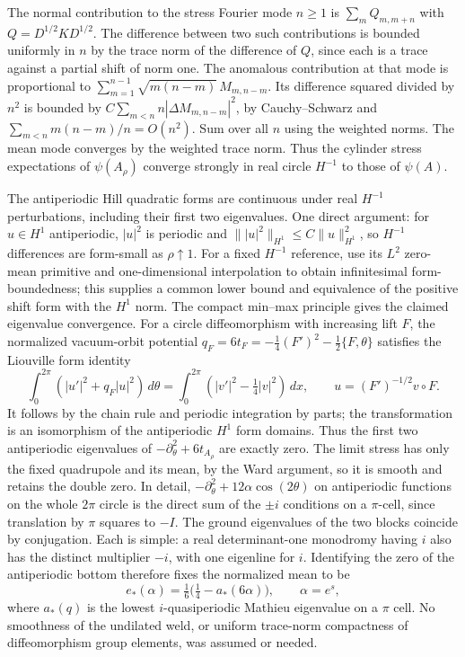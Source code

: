\documentclass[11pt]{article}
\begin{document}
The normal contribution to the stress Fourier mode \(n\ge1\) is \(\sum_m Q_{m,m+n}\) with \(Q=D^{1/2}KD^{1/2}\). The difference between two such contributions is bounded uniformly in \(n\) by the trace norm of the difference of \(Q\), since each is a trace against a partial shift of norm one. The anomalous contribution at that mode is proportional to \(\sum_{m=1}^{n-1}\sqrt{m(n-m)}\,M_{m,n-m}\). Its difference squared divided by \(n^2\) is bounded by \(C\sum_{m<n}n|\Delta M_{m,n-m}|^2\), by Cauchy--Schwarz and \(\sum_{m<n}m(n-m)/n=O(n^2)\). Sum over all \(n\) using the weighted norms. The mean mode converges by the weighted trace norm. Thus the cylinder stress expectations of \(\psi(A_\rho)\) converge strongly in real circle \(H^{-1}\) to those of \(\psi(A)\).

The antiperiodic Hill quadratic forms are continuous under real \(H^{-1}\) perturbations, including their first two eigenvalues. One direct argument: for \(u\in H^1\) antiperiodic, \(|u|^2\) is periodic and \(\||u|^2\|_{H^1}\le C\|u\|_{H^1}^2\), so \(H^{-1}\) differences are form-small as \(\rho\uparrow1\). For a fixed \(H^{-1}\) reference, use its \(L^2\) zero-mean primitive and one-dimensional interpolation to obtain infinitesimal form-boundedness; this supplies a common lower bound and equivalence of the positive shift form with the \(H^1\) norm. The compact min--max principle gives the claimed eigenvalue convergence. For a circle diffeomorphism with increasing lift \(F\), the normalized vacuum-orbit potential \(q_F=6t_F=-\tfrac14(F')^2-\tfrac12\{F,\theta\}\) satisfies the Liouville form identity
\[
 \int_0^{2\pi} (|u'|^2+q_F|u|^2)\,d\theta
 =\int_0^{2\pi} (|v'|^2-\tfrac14|v|^2)\,dx,\qquad
 u=(F')^{-1/2}v\circ F .
\]
It follows by the chain rule and periodic integration by parts; the transformation is an isomorphism of the antiperiodic \(H^1\) form domains. Thus the first two antiperiodic eigenvalues of \(-\partial_\theta^2+6t_{A_\rho}\) are exactly zero. The limit stress has only the fixed quadrupole and its mean, by the Ward argument, so it is smooth and retains the double zero. In detail, \(-\partial_\theta^2+12\alpha\cos(2\theta)\) on antiperiodic functions on the whole \(2\pi\) circle is the direct sum of the \(\pm i\) conditions on a \(\pi\)-cell, since translation by \(\pi\) squares to \(-I\). The ground eigenvalues of the two blocks coincide by conjugation. Each is simple: a real determinant-one monodromy having \(i\) also has the distinct multiplier \(-i\), with one eigenline for \(i\). Identifying the zero of the antiperiodic bottom therefore fixes the normalized mean to be \[
            e_*(\alpha)=\tfrac16\bigl(\tfrac14-a_*(6\alpha)\bigr),
            \qquad \alpha=e^s ,
\] where \(a_*(q)\) is the lowest \(i\)-quasiperiodic Mathieu eigenvalue on a \(\pi\) cell. No smoothness of the undilated weld, or uniform trace-norm compactness of diffeomorphism group elements, was assumed or needed.
\end{document}
